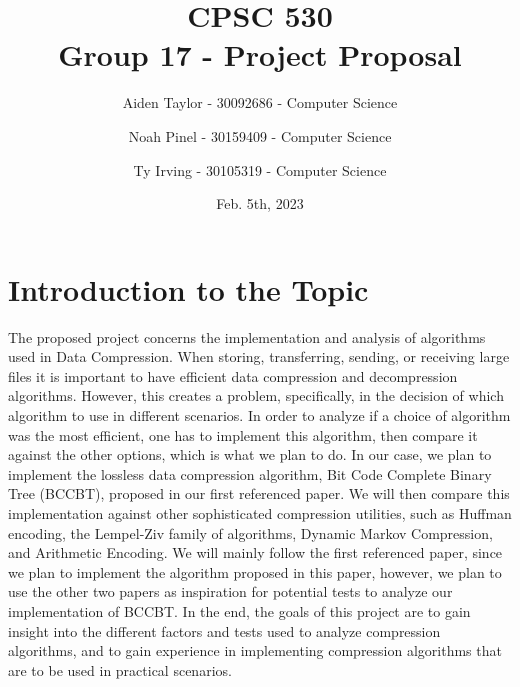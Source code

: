 \documentclass[11pt]{article}
\title{CPSC 530 \\ \Large Group 17 - Project Proposal}
\author{
Aiden Taylor - 30092686 - Computer Science
\and
Noah Pinel - 30159409 - Computer Science
\and
Ty Irving - 30105319 - Computer Science
}
\date{Feb. 5th, 2023}
\begin{document}
\maketitle
\newpage

\section*{Introduction to the Topic}
The proposed project concerns the implementation and analysis of algorithms used in Data Compression.
When storing, transferring, sending, or receiving large files it is important to have efficient data compression and decompression algorithms.
However, this creates a problem, specifically, in the decision of which algorithm to use in different scenarios.
In order to analyze if a choice of algorithm was the most efficient, one has to implement this algorithm, then compare it against the other options,
which is what we plan to do.
In our case, we plan to implement
the lossless data compression algorithm, Bit Code Complete Binary Tree (BCCBT), proposed in our first referenced paper. 
We will then compare this implementation against other sophisticated compression utilities,
such as Huffman encoding, the Lempel-Ziv family of algorithms, Dynamic Markov Compression, and Arithmetic Encoding.
We will mainly follow the first referenced paper, since we plan to implement the algorithm proposed in this paper,
however, we plan to use the other two papers as inspiration for potential tests to analyze our implementation of BCCBT.
In the end, the goals of this project are to gain insight into the different factors and tests used to analyze compression algorithms,
and to gain experience in implementing compression algorithms that are to be used in practical scenarios.
\end{document}
